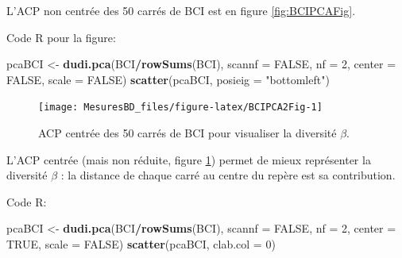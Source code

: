 \documentclass[
  11pt,
  french,
  a4paper,
  extrafontsizes,onecolumn,openright
  ]{memoir}
\newenvironment{Shaded}{\begin{snugshade}}{\end{snugshade}}
\newcommand{\DataTypeTok}[1]{\textcolor[rgb]{0.13,0.29,0.53}{#1}}
\newcommand{\DecValTok}[1]{\textcolor[rgb]{0.00,0.00,0.81}{#1}}
\newcommand{\KeywordTok}[1]{\textcolor[rgb]{0.13,0.29,0.53}{\textbf{#1}}}
\newcommand{\NormalTok}[1]{#1}
\newcommand{\OperatorTok}[1]{\textcolor[rgb]{0.81,0.36,0.00}{\textbf{#1}}}
\newcommand{\OtherTok}[1]{\textcolor[rgb]{0.56,0.35,0.01}{#1}}
\newcommand{\StringTok}[1]{\textcolor[rgb]{0.31,0.60,0.02}{#1}}
\begin{document}
\normalsize

L'ACP non centrée des 50 carrés de BCI est en figure \ref{fig:BCIPCAFig}.

Code R pour la figure:

\scriptsize

\begin{Shaded}
\begin{Highlighting}[]
\NormalTok{pcaBCI <-}\StringTok{ }\KeywordTok{dudi.pca}\NormalTok{(BCI}\OperatorTok{/}\KeywordTok{rowSums}\NormalTok{(BCI), }\DataTypeTok{scannf =} \OtherTok{FALSE}\NormalTok{, }\DataTypeTok{nf =} \DecValTok{2}\NormalTok{,}
    \DataTypeTok{center =} \OtherTok{FALSE}\NormalTok{, }\DataTypeTok{scale =} \OtherTok{FALSE}\NormalTok{)}
\KeywordTok{scatter}\NormalTok{(pcaBCI, }\DataTypeTok{posieig =} \StringTok{"bottomleft"}\NormalTok{)}
\end{Highlighting}
\end{Shaded}

\normalsize



\scriptsize

\begin{figure}

{\centering \texttt{[image: MesuresBD\_files/figure-latex/BCIPCA2Fig-1]} 

}

\caption{ACP centrée des 50 carrés de BCI pour visualiser la diversité \(\beta\).}\label{fig:BCIPCA2Fig}
\end{figure}

\normalsize

L'ACP centrée (mais non réduite, figure \ref{fig:BCIPCA2Fig}) permet de mieux représenter la diversité \(\beta\) : la distance de chaque carré au centre du repère est sa contribution.

Code R:

\scriptsize

\begin{Shaded}
\begin{Highlighting}[]
\NormalTok{pcaBCI <-}\StringTok{ }\KeywordTok{dudi.pca}\NormalTok{(BCI}\OperatorTok{/}\KeywordTok{rowSums}\NormalTok{(BCI), }\DataTypeTok{scannf =} \OtherTok{FALSE}\NormalTok{, }\DataTypeTok{nf =} \DecValTok{2}\NormalTok{,}
    \DataTypeTok{center =} \OtherTok{TRUE}\NormalTok{, }\DataTypeTok{scale =} \OtherTok{FALSE}\NormalTok{)}
\KeywordTok{scatter}\NormalTok{(pcaBCI, }\DataTypeTok{clab.col =} \DecValTok{0}\NormalTok{)}
\end{Highlighting}
\end{Shaded}
\end{document}
